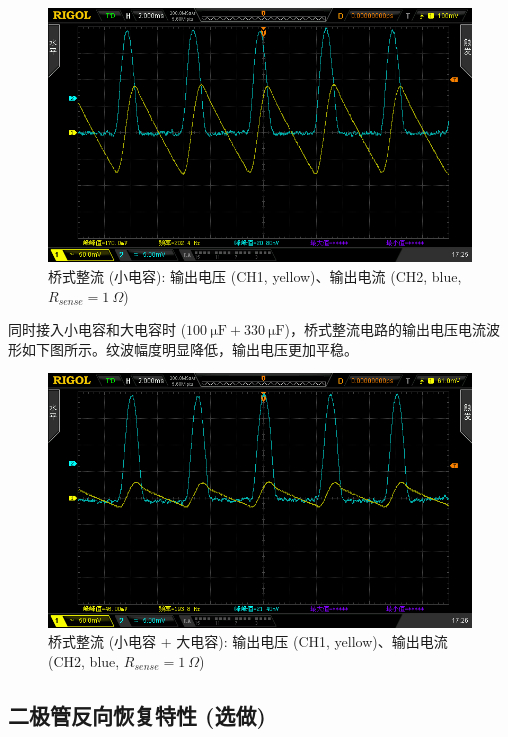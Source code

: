 \documentclass[UTF8]{article}
\begin{document}
\begin{figure}[H]\centering
    \includegraphics[width=\columnwidth]{LCE-01-二极管/assets/二极管整流电路/桥式整流-接电容-电流波形.png}
    \caption{桥式整流 (小电容): 输出电压 (CH1, yellow)、输出电流 (CH2, blue, $R_{sense} = 1\ \Omega$)}
\end{figure}

同时接入小电容和大电容时 ($100 \ \mathrm{\mu F} + 330 \ \mathrm{\mu F}$)，桥式整流电路的输出电压电流波形如下图所示。纹波幅度明显降低，输出电压更加平稳。

\begin{figure}[H]\centering
    \includegraphics[width=\columnwidth]{LCE-01-二极管/assets/二极管整流电路/桥式整流-接大电容-电流波形.png}
    \caption{桥式整流 (小电容 + 大电容): 输出电压 (CH1, yellow)、输出电流 (CH2, blue, $R_{sense} = 1\ \Omega$)}
\end{figure}


\subsection{二极管反向恢复特性 (选做)}
\end{document}
